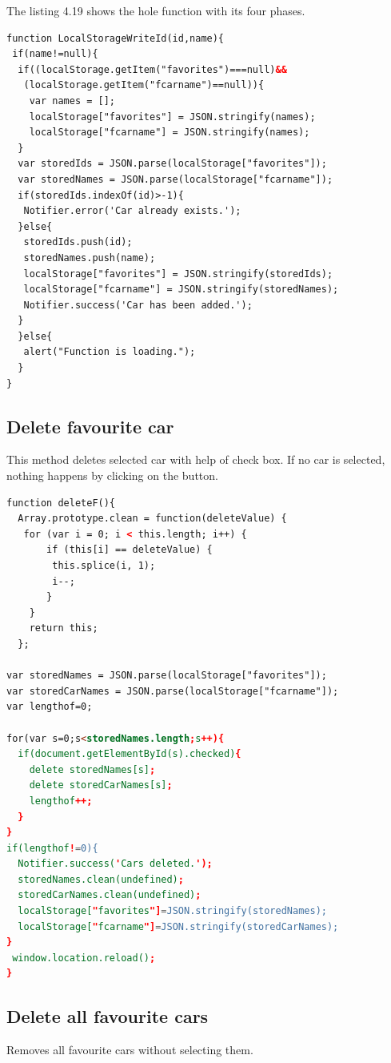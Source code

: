 The listing 4.19 shows the hole function with its four phases.\\
\begin{lstlisting}[language=html, caption= 
Save car function,captionpos=b]
function LocalStorageWriteId(id,name){
 if(name!=null){
  if((localStorage.getItem("favorites")===null)&&
   (localStorage.getItem("fcarname")==null)){
	var names = [];
	localStorage["favorites"] = JSON.stringify(names);
	localStorage["fcarname"] = JSON.stringify(names);
  }		
  var storedIds = JSON.parse(localStorage["favorites"]);
  var storedNames = JSON.parse(localStorage["fcarname"]);	
  if(storedIds.indexOf(id)>-1){
   Notifier.error('Car already exists.');
  }else{
   storedIds.push(id);
   storedNames.push(name);
   localStorage["favorites"] = JSON.stringify(storedIds);
   localStorage["fcarname"] = JSON.stringify(storedNames);
   Notifier.success('Car has been added.');
  }
  }else{
   alert("Function is loading.");
  }
}
\end{lstlisting}



\subsection{Delete favourite car}
This method deletes selected car with help of check box. If no car is selected, nothing happens by clicking on the button.
\\

\begin{lstlisting}[language=html, caption= 
Delete function,captionpos=b]
function deleteF(){
  Array.prototype.clean = function(deleteValue) {
   for (var i = 0; i < this.length; i++) {
       if (this[i] == deleteValue) {         
        this.splice(i, 1);
	    i--;
	   }
    }
    return this;
  };
	
var storedNames = JSON.parse(localStorage["favorites"]); 
var storedCarNames = JSON.parse(localStorage["fcarname"]); 
var lengthof=0;

for(var s=0;s<storedNames.length;s++){
  if(document.getElementById(s).checked){
    delete storedNames[s];
    delete storedCarNames[s];
	lengthof++;
  }		
}
if(lengthof!=0){
  Notifier.success('Cars deleted.');
  storedNames.clean(undefined);
  storedCarNames.clean(undefined);
  localStorage["favorites"]=JSON.stringify(storedNames);
  localStorage["fcarname"]=JSON.stringify(storedCarNames);
}
 window.location.reload();
}
\end{lstlisting}
\newpage
\subsection{Delete all favourite cars}
Removes all favourite cars without selecting them.


